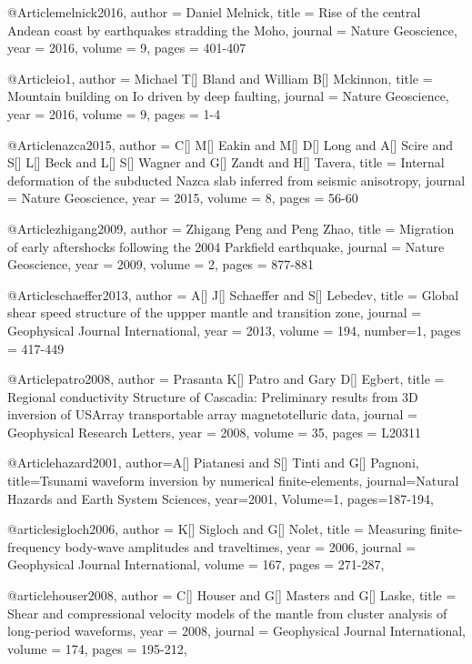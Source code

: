 @Article{melnick2016,
  author = 	 {Daniel Melnick},
  title = 	 {Rise of the central Andean coast by earthquakes stradding the Moho},
  journal = 	 {Nature Geoscience},
  year = 	 2016,
  volume = 9,
  pages =	 {401-407}
}

@Article{io1,
  author = 	 {Michael T[] Bland and William B[] Mckinnon},
  title = 	 {Mountain building on {I}o driven by deep faulting},
  journal = 	 {Nature Geoscience},
  year = 	 2016,
  volume = 9,
  pages =	 {1-4}
}

@Article{nazca2015,
  author = 	 {C[] M[] Eakin and M[] D[] Long and A[] Scire and S[] L[] Beck and L[] S[] Wagner and G[] Zandt and H[] Tavera},
  title = 	 {Internal deformation of the subducted Nazca slab inferred from seismic anisotropy},
  journal = 	 {Nature Geoscience},
  year = 	 2015,
  volume = 8,
  pages =	 {56-60}
}

@Article{zhigang2009,
  author = 	 {Zhigang Peng and Peng Zhao},
  title = 	 {Migration of early aftershocks following the 2004 Parkfield earthquake},
  journal = 	 {Nature Geoscience},
  year = 	 2009,
  volume = 2,
  pages =	 {877-881}
}

@Article{schaeffer2013,
  author = 	 {A[] J[] Schaeffer and S[] Lebedev},
  title = 	 {Global shear speed structure of the uppper mantle and transition zone},
  journal = 	 {Geophysical Journal International},
  year = 	 2013,
  volume = 194,
  number=1,
  pages =	 {417-449}
}

@Article{patro2008,
  author = 	 {Prasanta K[] Patro and Gary D[] Egbert},
  title = 	 {Regional conductivity Structure of Cascadia: Preliminary results from 3D inversion of USArray transportable array magnetotelluric data},
  journal = 	 {Geophysical Research Letters},
  year = 	 2008,
  volume = 35,
  pages =	 {L20311}
}

@Article{hazard2001,
  author={A[] Piatanesi and S[] Tinti and G[] Pagnoni},
  title={Tsunami waveform inversion by numerical finite-elements},
  journal={Natural Hazards and Earth System Sciences},
  year=2001,
  Volume=1,
  pages={187-194},
}

@article{sigloch2006,
author = {K[] Sigloch and G[] Nolet},
title = {Measuring finite-frequency body-wave amplitudes and traveltimes},
year = {2006},
journal = {Geophysical Journal International},
volume = {167},
pages = {271-287},
}

@article{houser2008,
author = {C[] Houser and G[] Masters and G[] Laske},
title = {Shear and compressional velocity models of the mantle from cluster analysis of long-period waveforms},
year = {2008},
journal = {Geophysical Journal International},
volume = {174},
pages = {195-212},
}


